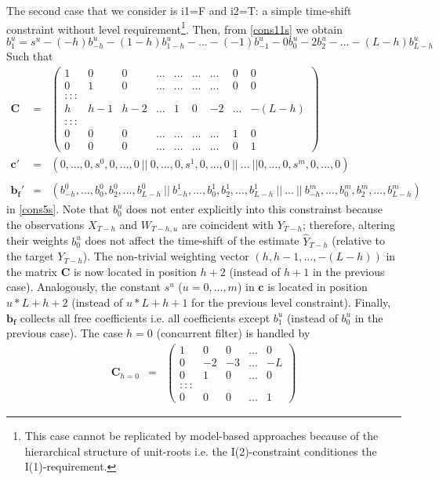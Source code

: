 \documentclass[11pt]{article}
\begin{document}
The second case that we consider is i1=F and i2=T: a simple time-shift constraint without level requirement\footnote{This case cannot be replicated by model-based approaches because of the hierarchical structure of unit-roots i.e. the I(2)-constraint conditiones the I(1)-requirement.}. Then, from \ref{cons11s} we obtain
\[
b_1^u=s^u-(-h)b_{-h}^u-(1-h)b_{1-h}^u-...-(-1)b_{-1}^u-0b_0^u-2b_2^u-...-(L-h)b_{L-h}^u
\]
Such that
\begin{eqnarray}\label{cons6s}
\mathbf{C}&=&\left(\begin{array}{ccccccccc}
1&0&0&...&...&...&...&0&0\\
0&1&0&...&...&...&...&0&0\\
:::\\
h&h-1&h-2&...&1&0&-2&...&-(L-h)\\
:::\\
0&0&0&...&...&...&...&1&0\\
0&0&0&...&...&...&...&0&1
\end{array}\right)\\
\mathbf{c}'&=&(0,...,0,s^0,0,...,0~||~0,...,0,s^1,0,...,0~||~...~||0,...,0,s^m,0,...,0)\nonumber\\
\nonumber\\
\mathbf{b_f}'&=&(b_{-h}^0,...,b_{0}^0,b_2^0,...,b_{L-h}^0~||~b_{-h}^1,...,b_{0}^1,b_2^1,...,b_{L-h}^1~||~...~||~b_{-h}^m,...,b_{0}^m,b_2^m,...,b_{L-h}^m)\nonumber
\end{eqnarray}
in \ref{cons5s}. Note that $b_0^u$ does not enter explicitly into this constrainst because the observations $X_{T-h}$ and $W_{T-h,u}$ are coincident with $Y_{T-h}$; therefore, altering their weights $b_0^u$ does not affect the time-shift of the estimate $\hat{Y}_{T-h}$ (relative to the target $Y_{T-h}$). The non-trivial weighting vector $(h,h-1,...,-(L-h))$ in the matrix $\mathbf{C}$ is now located in position $h+2$ (instead of $h+1$ in the previous case). Analogously, the constant $s^u$ ($u=0,...,m$) in $\mathbf{c}$ is located in position $u*L+h+2$ (instead of $u*L+h+1$ for the previous level constraint). Finally, $\mathbf{b_f}$ collects all free coefficients i.e. all coefficients except $b_1^u$ (instead of $b_0^u$ in the previous case). The case $h=0$ (concurrent filter) is handled by
\begin{eqnarray*}%
\mathbf{C}_{h=0}&=&\left(\begin{array}{ccccc}
1&0&0&...&0\\
0&-2&-3&...&-L\\
0&1&0&...&0\\
:::\\
0&0&0&...&1
\end{array}\right)\nonumber
\end{eqnarray*}
\end{document}
